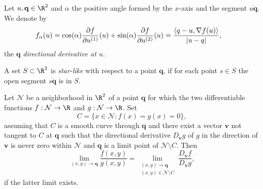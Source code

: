 \begin{dfn}
	Let $u,\mathbf{q}\in \R^2$ and $\alpha$ the positive angle formed by the $x$-axis and the segment
	$\overline{u \mathbf{q}}$.	We denote by 
	\begin{align*}
		f_{\alpha}(u) &= 
			\cos(\alpha) 		
			\frac{\partial f}{\partial u^{(1)}}(u) + 
			\sin(\alpha)
			\frac{\partial f}{\partial u^{(2)}}(u) 
			= \frac{ \left\langle q-u, \nabla f(u)\right\rangle}{|u-q|},			
	\end{align*}
	the $\mathbf{q}$ \emph{directional derivative at $u$}.
\end{dfn}
\begin{dfn}
	A set $S\subset \R^2$ is \emph{star-like} with respect to a point $\mathbf{q}$, if for each point $s \in S$ the open 
	segment $\overline{s \mathbf{q}}$ is in $S$.
\end{dfn}

\begin{thm}\label{thm:Lawlor}
	Let $\mathcal{N}$ be a neighborhood in $\R^2$ of a point $\mathbf{q}$ for  which
	the two differentiable functions $f:\mathcal{N}\to \R$ and $g:\mathcal{N}\to \R$. Set 
	$$
		C=\{x \in \mathcal{N}: f(x)=g(x)=0 \},
	$$
	assuming that $C$ is a smooth curve through $\mathbf{q}$ and 	
	there exist a vector $\mathbf{v}$ not tangent to $C$ at $\mathbf{q}$
	such that the directional derivative $D_{\mathbf{v}}g$ of $g$ in the direction of $\mathbf{v}$ 
	is never zero within $\mathcal{N}$ and $\mathbf{q}$ is a limit point of $\mathcal{N}\setminus C$. Then
	\begin{equation*}
		\lim_{(x,y)\to \mathbf{q}}
		\frac{f(x,y)}{g(x,y)} =
		\lim_{
				\substack{
					(x,y)\to \mathbf{q}\\ 
					(x,y)\in \mathcal{N} \setminus C
				}
		}
		\frac{D_{\mathbf{v}} f }{D_{\mathbf{v}} g},
	\end{equation*}
	if the latter limit exists.
\end{thm}



